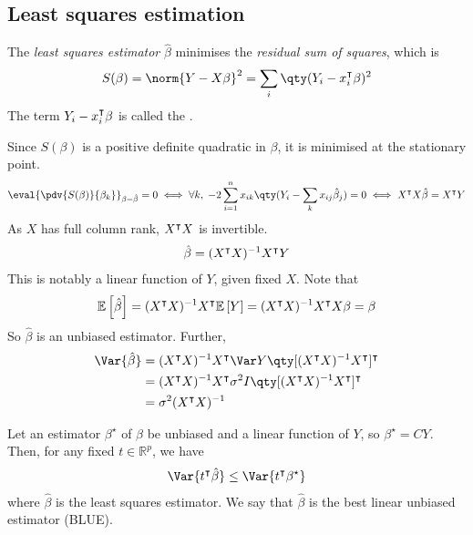 \subsection{Least squares estimation}
\begin{definition}
	The \textit{least squares estimator} $\hat \beta$ minimises the \textit{residual sum of squares}, which is
	\begin{align*}
		S(\beta) = \norm{Y-X\beta}^2 = \sum_i \qty(Y_i - x_i^\tran \beta)^2
	\end{align*}
	The term $Y_i - x_i^\intercal \beta$ is called the .
\end{definition}
Since $S(\beta)$ is a positive definite quadratic in $\beta$, it is minimised at the stationary point.
\begin{align*}
	\eval{\pdv{S(\beta)}{\beta_k}}_{\beta = \hat \beta} = 0 \iff \forall k,\;-2\sum_{i=1}^n x_{ik} \qty(Y_i - \sum_k x_{ij} \hat \beta_j) = 0 \iff X^\tran X \hat \beta = X^\tran Y
\end{align*}
As $X$ has full column rank, $X^\intercal X$ is invertible.
\begin{align*}
	\hat \beta = (X^\intercal X)^{-1} X^\intercal Y
\end{align*}
This is notably a linear function of $Y$, given fixed $X$.
Note that
\begin{align*}
	\mathbb{E}\left[{\hat \beta}\right] = (X^\intercal X)^{-1} X^\intercal \mathbb{E}\left[{Y}\right] = (X^\intercal X)^{-1} X^\intercal X\beta = \beta
\end{align*}
So $\hat \beta$ is an unbiased estimator.
Further,
\begin{align*}
	\Var{\hat \beta} & = (X^\tran X)^{-1} X^\tran \Var Y \qty[(X^\tran X)^{-1} X^\tran]^\tran     \\
	                 & = (X^\tran X)^{-1} X^\tran \sigma^2 I \qty[(X^\tran X)^{-1} X^\tran]^\tran \\
	                 & = \sigma^2 (X^\tran X)^{-1}
\end{align*}
\begin{theorem}
	Let an estimator $\beta^\star$ of $\beta$ be unbiased and a linear function of $Y$, so $\beta^\star = CY$.
	Then, for any fixed $t \in \mathbb R^p$, we have
	\begin{align*}
		\Var{t^\tran \hat \beta} \leq \Var{t^\tran \beta^\star}
	\end{align*}
	where $\hat \beta$ is the least squares estimator.
	We say that $\hat \beta$ is the best linear unbiased estimator (BLUE).
\end{theorem}
